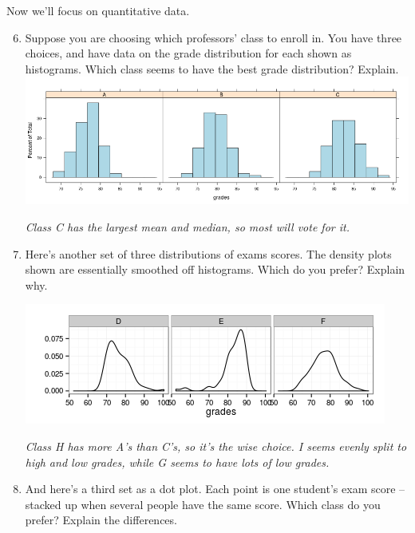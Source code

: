  Now we'll focus on quantitative data.    \vspace{-.3in}
 \begin{enumerate}
\setcounter{enumi}{5}
 \item \label{center}
   Suppose you are choosing which professors' class to enroll
     in.  You have three choices, and have data on the grade
     distribution for each shown as histograms.  
     Which class seems to have the best grade distribution? Explain. \\
  \includegraphics[width = .7\linewidth]{plots/3classGradeCompareMn.png}
\begin{students}
    \vspace{2cm}    
\end{students}

\begin{key}
  {\it Class C has the largest mean and median, so most will vote for it. }
\end{key}

\item  \label{skew} Here's another set of three distributions of exams scores.
     The density plots shown are essentially smoothed off histograms.
     Which do you prefer?  Explain why. 

   \includegraphics[width=.7\linewidth]{plots/3classGradeCompareSkw.png}
\begin{students}
    \vspace{2cm}    
\end{students}

\begin{key}
  {\it Class H has more A's than C's, so it's the wise choice.  I
    seems evenly split to high and low grades, while G seems to have
    lots of low grades.}
\end{key}

    
   \item  \label{spread}And here's a third set as a dot plot. Each point is one
     student's exam score -- stacked up when several people have the
     same score.   Which class do you prefer?  Explain the
     differences.  
     

\end{enumerate}
